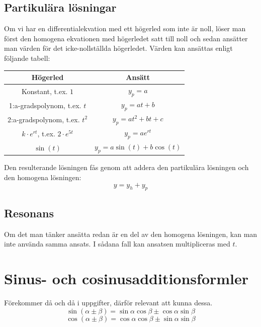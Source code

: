 \documentclass{article}
\newenvironment{ankiflashcard}[1]{}{}
\begin{document}
\begin{appendix}
\begin{ankiflashcard}{Repetera envariabeln: ange lösningarna till en typisk andra ordningens linjär homogen differentialekvation med konstanta koefficienter.}
\subsection*{Partikulära lösningar}

Om vi har en differentialekvation med ett högerled som inte är noll, löser man först den homogena ekvationen med högerledet satt till noll och sedan ansätter man värden för det icke-nollställda högerledet. Värden kan ansättas enligt följande tabell:
\begin{center}
\begin{tabular}{|c|c|}
\hline
Högerled & Ansätt \\
\hline
Konstant, t.ex. \( 1 \) & \( y_p = a \) \\
\hline
1:a-gradspolynom, t.ex. \( t \) & \( y_p = at + b \) \\
\hline
2:a-gradspolynom, t.ex. \( t^2 \) & \( y_p = at^2 + bt + c \) \\
\hline
\( k \cdot e^{rt} \), t.ex. \( 2 \cdot e^{5t} \) & \( y_p = ae^{rt} \) \\
\hline
\( \sin(t) \) & \( y_p = a\sin(t) + b\cos(t) \) \\
\hline
\end{tabular}
\end{center}

Den resulterande lösningen fås genom att addera den partikulära lösningen och den homogena lösningen:
$$
y = y_h + y_p
$$

\subsection*{Resonans}

Om det man tänker ansätta redan är en del av den homogena lösningen, kan man inte använda samma ansats. I sådana fall kan ansatsen multipliceras med \( t \).

    
\end{ankiflashcard}

\begin{ankiflashcard}{Ange additionsformler för sinus och cosinus}
    \section{Sinus- och cosinusadditionsformler}
    Förekommer då och då i uppgifter, därför relevant att kunna dessa.
    $$\sin(\alpha\pm\beta)=\sin \alpha \cos \beta \pm \cos \alpha \sin \beta$$
     $$\cos(\alpha\pm\beta)=\cos \alpha \cos \beta \pm \sin \alpha \sin \beta$$
\end{ankiflashcard}
\end{appendix}
\end{document}
